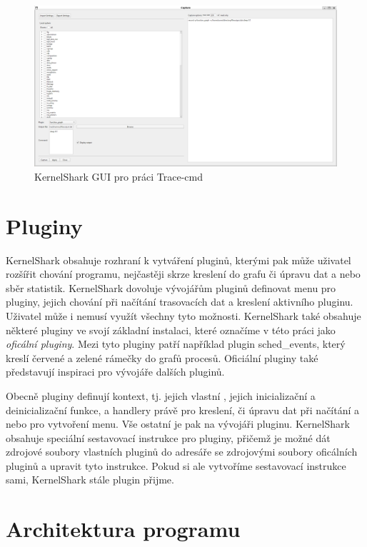 \begin{figure}[p]\centering
    \includegraphics[width=140mm]{img/KernelShark/kshark-record}
    \caption{KernelShark GUI pro práci Trace-cmd}
    \label{kshark-record}
\end{figure}

\section{Pluginy}

KernelShark obsahuje rozhraní k vytváření pluginů, kterými pak může uživatel rozšířit chování programu, nejčastěji skrze kreslení do grafu či úpravu dat a nebo sběr statistik. KernelShark dovoluje vývojářům pluginů definovat menu pro pluginy, jejich chování při načítání trasovacích dat a kreslení aktivního pluginu. Uživatel může i nemusí využít všechny tyto možnosti. KernelShark také obsahuje některé pluginy ve svojí základní instalaci, které označíme v této práci jako \emph{oficální pluginy}. Mezi tyto pluginy patří například plugin sched\_events, který kreslí červené a zelené rámečky do grafů procesů. Oficiální pluginy také představují inspiraci pro vývojáře dalších pluginů.

Obecně pluginy definují kontext, tj. jejich vlastní , jejich inicializační a deinicializační funkce, a handlery právě pro kreslení, či úpravu dat při načítání a nebo pro vytvoření menu. Vše ostatní je pak na vývojáři pluginu. KernelShark obsahuje speciální sestavovací instrukce pro pluginy, přičemž je možné dát zdrojové soubory vlastních pluginů do adresáře se zdrojovými soubory oficálních pluginů a upravit tyto instrukce. Pokud si ale vytvoříme sestavovací instrukce sami, KernelShark stále plugin přijme.

\section{Architektura programu}

